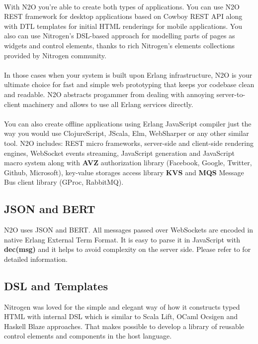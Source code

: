 \paragraph{}
With N2O you're able to create both types of applications. You can use N2O REST framework
for desktop applications based on Cowboy REST API along with DTL
templates for initial HTML renderings for mobile applications.
You also can use Nitrogen's DSL-based approach for modelling parts of pages
as widgets and control elements, thanks to rich
Nitrogen's elements collections provided by Nitrogen community.

\paragraph{}
In those cases when your system is built upon Erlang infrastructure, N2O
is your ultimate choice for fast and simple web prototyping that keeps yor codebase clean and readable.
N2O abstracts progammer from dealing with annoying server-to-client machinery and allows to use all Erlang services directly.

\paragraph{}
You can also create offline applications using Erlang JavaScript compiler
just the way you would use ClojureScript, JScala, Elm, WebSharper
or any other similar tool. N2O includes: REST micro frameworks,
server-side and client-side rendering engines,
WebSocket events streaming, JavaScript generation
and JavaScript macro system along with {\bf AVZ} authorization
library (Facebook, Google, Twitter, Github, Microsoft), key-value storages
access library {\bf KVS} and {\bf MQS} Message Bus client library (GProc, RabbitMQ).

\subsection{JSON and BERT}
N2O uses JSON and BERT. All messages passed over
WebSockets are encoded in native Erlang External Term Format.
It is easy to parse it in JavaScript with {\bf dec(msg)}
and it helps to avoid complexity on the server side. Please refer
to  for detailed information.

\subsection{DSL and Templates}
Nitrogen was loved for the simple and elegant way of how it constructs typed
HTML with internal DSL which is similar to Scala Lift,
OCaml Ocsigen and Haskell Blaze approaches. That makes possible to develop a library of reusable control
elements and components in the host language.

